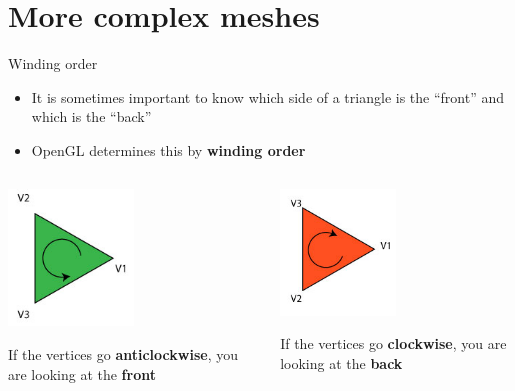 \part{More complex meshes}
\frame{\partpage}

\begin{frame}{Winding order}
	\begin{itemize}
		\pause\item It is sometimes important to know which side of a triangle is the ``front'' and which is the ``back''
		\pause\item OpenGL determines this by \textbf{winding order}
	\end{itemize}
	\begin{columns}
		\pause
		\begin{column}{0.48\textwidth}
			\begin{center}
				\includegraphics[width=0.5\textwidth]{winding_ccw}
				
				If the vertices go \textbf{anticlockwise}, you are looking at the \textbf{front}
			\end{center}
		\end{column}
		\pause
		\begin{column}{0.48\textwidth}
			\begin{center}
				\includegraphics[width=0.5\textwidth]{winding_cw}
				
				If the vertices go \textbf{clockwise}, you are looking at the \textbf{back}
			\end{center}
		\end{column}
	\end{columns}
\end{frame}

